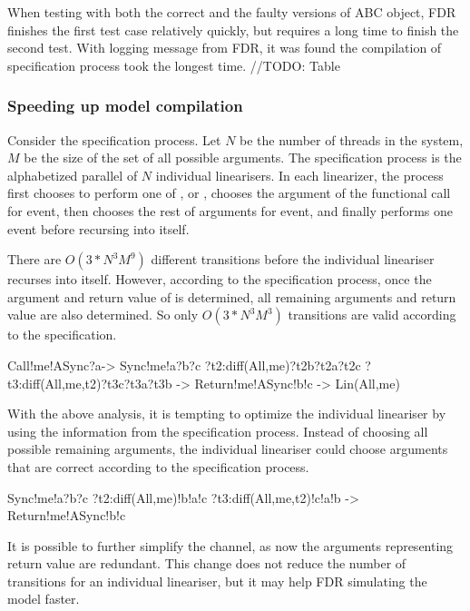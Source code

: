 \documentclass{article}
\begin{document}
When testing with both the correct and the faulty versions of ABC object, FDR finishes the first test case relatively quickly, but requires a long time to finish the second test. With logging message from FDR, it was found the compilation of specification process took the longest time. 
//TODO: Table

\subsubsection{Speeding up model compilation}
Consider the specification process. Let $N$ be the number of threads in the system, $M$ be the size of the set of all possible arguments. The specification process is the alphabetized parallel of $N$ individual linearisers. In each linearizer, the process first chooses to perform one of ,  or , chooses the argument of the functional call for  event, then chooses the rest of arguments for  event, and finally performs one event before recursing into itself.

There are $O(3*N^3M^9)$ different transitions before the individual lineariser recurses into itself. However, according to the specification process, once the argument and return value of  is determined, all remaining arguments and return value are also determined. So only $O(3*N^3M^3)$ transitions are valid according to the specification. 

\begin{cspinline}{}{}
  Call!me!ASync?a->
    Sync!me!a?b?c 
        ?t2:diff(All,{me})?t2b?t2a?t2c 
        ?t3:diff(All,{me,t2})?t3c?t3a?t3b ->
    Return!me!ASync!b!c ->
    Lin(All,me)
\end{cspinline}
    
With the above analysis, it is tempting to optimize the individual lineariser by using the information from the specification process. Instead of choosing all possible remaining arguments, the individual lineariser could choose arguments that are correct according to the specification process.

\begin{cspinline}{}{}
  Sync!me!a?b?c 
      ?t2:diff(All,{me})!b!a!c
      ?t3:diff(All,{me,t2})!c!a!b ->
  Return!me!ASync!b!c
\end{cspinline}

It is possible to further simplify the  channel, as now the arguments representing return value are redundant. This change does not reduce the number of transitions for an individual lineariser, but it may help FDR simulating the model faster.
\end{document}
